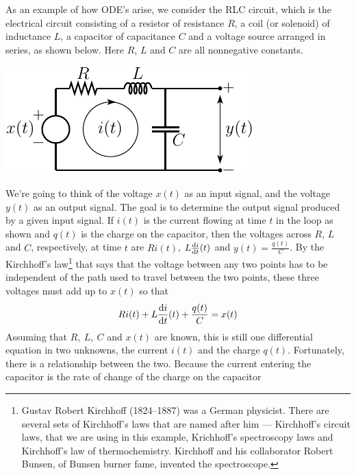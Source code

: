 \begin{eg}\label{eg:RLC}
As an example of how ODE's arise, we consider the RLC circuit, which is
the electrical circuit consisting of a resistor of
resistance $R$, a coil (or solenoid) of inductance $L$, a capacitor 
of capacitance $C$ and a voltage source arranged in series, as shown below. 
Here $R$, $L$
and $C$ are all nonnegative constants.
\begin{efig}
\begin{center}
    \includegraphics[scale=1.3]{RLC.pdf}
\end{center}
\end{efig}
 We're going to think of the voltage $x(t)$ as an input signal,
and the voltage $y(t)$ as an output signal. 
The goal is to determine the output signal produced by a given input signal. 
If $i(t)$ is the current flowing at time $t$ in the loop as shown and 
$q(t)$ is the charge on the capacitor, then the voltages across $R$, $L$ 
and $C$, respectively, at time $t$ are
$Ri(t)$, $L\diff{i}{t}(t)$ and $y(t)=\frac{q(t)}{C}$. By the Kirchhoff's 
law\footnote{Gustav Robert Kirchhoff (1824--1887) was a German physicist.
There are several sets of Kirchhoff's laws that are named after him ---
Kirchhoff's circuit laws, that we are using in this example, Krichhoff's
spectroscopy laws and Kirchhoff's law of thermochemistry. Kirchhoff and his collaborator Robert Bunsen, of Bunsen burner fame, invented the spectroscope.
} 
that says that the voltage between any two points has to be independent 
of the path used to travel between the two points, these three voltages 
must add up to $x(t)$ so that
\begin{equation}\label{eqn:RLCrlc}
Ri(t) + L\diff{i}{t}(t) + \frac{q(t)}{C} = x(t)
\end{equation}
Assuming that $R,\ L,\ C$ and $x(t)$ are known, this is still one 
differential equation in two unknowns, the current $i(t)$ and the charge $q(t)$. 
Fortunately, there is a relationship between the two. Because the current entering the capacitor is the rate of change of the charge on the capacitor

\end{eg}
